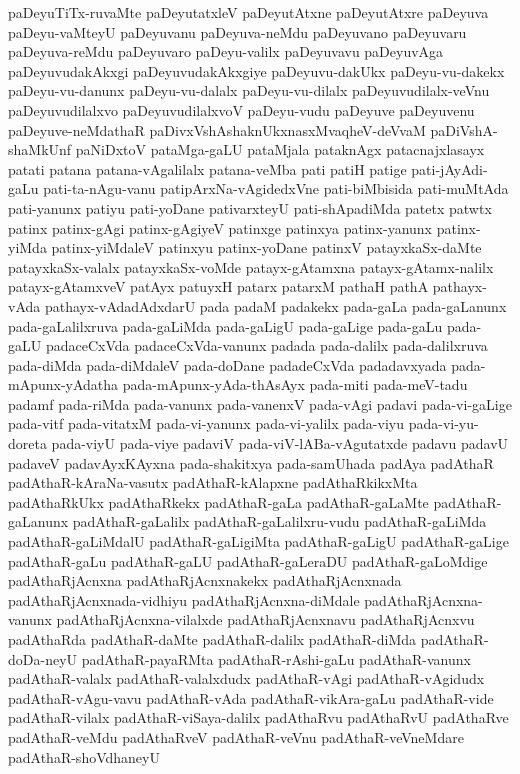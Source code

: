 {paDeyuTiTx-ruvaMte
paDeyutatxleV
paDeyutAtxne
paDeyutAtxre
paDeyuva
paDeyu-vaMteyU
paDeyuvanu
paDeyuva-neMdu
paDeyuvano
paDeyuvaru
paDeyuva-reMdu
paDeyuvaro
paDeyu-valilx
paDeyuvavu
paDeyuvAga
paDeyuvudakAkxgi
paDeyuvudakAkxgiye
paDeyuvu-dakUkx
paDeyu-vu-dakekx
paDeyu-vu-danunx
paDeyu-vu-dalalx
paDeyu-vu-dilalx
paDeyuvudilalx-veVnu
paDeyuvudilalxvo
paDeyuvudilalxvoV
paDeyu-vudu
paDeyuve
paDeyuvenu
paDeyuve-neMdathaR
paDivxVshAshaknUkxnasxMvaqheV-deVvaM
paDiVshA-shaMkUnf
paNiDxtoV
pataMga-gaLU
pataMjala
pataknAgx
patacnajxlasayx
patati
patana
patana-vAgalilalx
patana-veMba
pati
patiH
patige
pati-jAyAdi-gaLu
pati-ta-nAgu-vanu
patipArxNa-vAgidedxVne
pati-biMbisida
pati-muMtAda
pati-yanunx
patiyu
pati-yoDane
pativarxteyU
pati-shApadiMda
patetx
patwtx
patinx
patinx-gAgi
patinx-gAgiyeV
patinxge
patinxya
patinx-yanunx
patinx-yiMda
patinx-yiMdaleV
patinxyu
patinx-yoDane
patinxV
patayxkaSx-daMte
patayxkaSx-valalx
patayxkaSx-voMde
patayx-gAtamxna
patayx-gAtamx-nalilx
patayx-gAtamxveV
patAyx
patuyxH
patarx
patarxM
pathaH
pathA
pathayx-vAda
pathayx-vAdadAdxdarU
pada
padaM
padakekx
pada-gaLa
pada-gaLanunx
pada-gaLalilxruva
pada-gaLiMda
pada-gaLigU
pada-gaLige
pada-gaLu
pada-gaLU
padaceCxVda
padaceCxVda-vanunx
padada
pada-dalilx
pada-dalilxruva
pada-diMda
pada-diMdaleV
pada-doDane
padadeCxVda
padadavxyada
pada-mApunx-yAdatha
pada-mApunx-yAda-thAsAyx
pada-miti
pada-meV-tadu
padamf
pada-riMda
pada-vanunx
pada-vanenxV
pada-vAgi
padavi
pada-vi-gaLige
pada-vitf
pada-vitatxM
pada-vi-yanunx
pada-vi-yalilx
pada-viyu
pada-vi-yu-doreta
pada-viyU
pada-viye
padaviV
pada-viV-lABa-vAgutatxde
padavu
padavU
padaveV
padavAyxKAyxna
pada-shakitxya
pada-samUhada
padAya
padAthaR
padAthaR-kAraNa-vasutx
padAthaR-kAlapxne
padAthaRkikxMta
padAthaRkUkx
padAthaRkekx
padAthaR-gaLa
padAthaR-gaLaMte
padAthaR-gaLanunx
padAthaR-gaLalilx
padAthaR-gaLalilxru-vudu
padAthaR-gaLiMda
padAthaR-gaLiMdalU
padAthaR-gaLigiMta
padAthaR-gaLigU
padAthaR-gaLige
padAthaR-gaLu
padAthaR-gaLU
padAthaR-gaLeraDU
padAthaR-gaLoMdige
padAthaRjAcnxna
padAthaRjAcnxnakekx
padAthaRjAcnxnada
padAthaRjAcnxnada-vidhiyu
padAthaRjAcnxna-diMdale
padAthaRjAcnxna-vanunx
padAthaRjAcnxna-vilalxde
padAthaRjAcnxnavu
padAthaRjAcnxvu
padAthaRda
padAthaR-daMte
padAthaR-dalilx
padAthaR-diMda
padAthaR-doDa-neyU
padAthaR-payaRMta
padAthaR-rAshi-gaLu
padAthaR-vanunx
padAthaR-valalx
padAthaR-valalxdudx
padAthaR-vAgi
padAthaR-vAgidudx
padAthaR-vAgu-vavu
padAthaR-vAda
padAthaR-vikAra-gaLu
padAthaR-vide
padAthaR-vilalx
padAthaR-viSaya-dalilx
padAthaRvu
padAthaRvU
padAthaRve
padAthaR-veMdu
padAthaRveV
padAthaR-veVnu
padAthaR-veVneMdare
padAthaR-shoVdhaneyU
}
